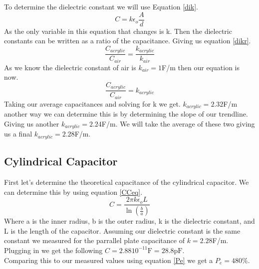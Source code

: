 \documentclass[10pt]{article}
\begin{document}
To determine the dielectric constant we will use Equation \ref{dik}.\\
\begin{equation}\label{dik}
  C = k\epsilon_{o}\frac{A}{d}
\end{equation}
As the only variable in this equation that changes is k. Then the dielectric constants
can be written as a ratio of the capacitance. Giving us equation \ref{dikr}.\\
\begin{equation}\label{dikr}
  \frac{C_{acrylic}}{C_{air}} = \frac{k_{acrylic}}{k_{air}}
\end{equation}
As we know the dielectric constant of air is $k_{air} = 1$F/m then our equation is now.\\
\begin{equation}
  \frac{C_{acrylic}}{C_{air}} = k_{acrylic}
\end{equation}
Taking our average capacitances and solving for k we get. $k_{acrylic} = 2.32$F/m another way
we can determine this is by determining the slope of our trendline. Giving us another $k_{acrylic} = 2.24$F/m.
We will take the average of these two giving us a final $k_{acrylic} = 2.28$F/m.\\
\subsection*{Cylindrical Capacitor}

First let's determine the theoretical capacitance of the cylindrical capacitor. We can 
determine this by using equation \ref{CCeq}.\\

\begin{equation}\label{CCeq}
  C = \frac{2\pi k \epsilon_{o}L}{\ln(\frac{b}{a})}
\end{equation}
Where a is the inner radius, b is the outer radius, k is the dielectric constant, and L is the length of the capacitor. 
Assuming our dielectric constant is the same constant we measured for the parrallel plate capacitance of $k = 2.28$F/m.
Plugging in we get the following $C = 2.88 10^{-11}\mathrm{F} = 28.8\mathrm{pF}$.\\
Comparing this to our measured values using equation \ref{Pe} we get a $P_{e} = 480\%$.\\
\end{document}
